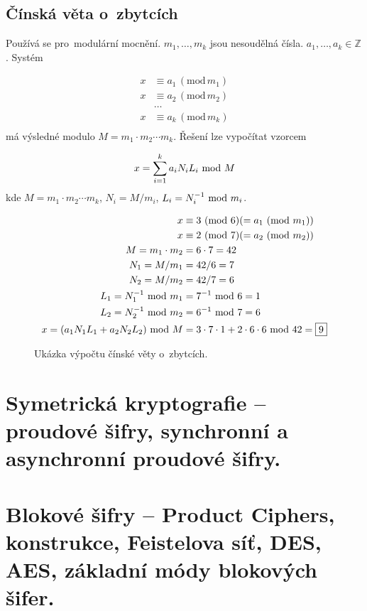 \clearpage
\subsection{Čínská věta o~zbytcích}

Používá se pro~modulární mocnění. $m_1, \dots, m_k$ jsou nesoudělná čísla. $a_1, \dots, a_k \in \mathbb{Z}$. Systém

\begin{align*}
x &\equiv a_1 \,(\mathrm{mod}\, m_1) \\
x &\equiv a_2 \,(\mathrm{mod}\, m_2) \\
&\dots \\
x &\equiv a_k \,(\mathrm{mod}\, m_k) \\
\end{align*} %
má výsledné modulo $M = m_1 \cdot m_2 \cdots m_k$. Řešení lze vypočítat vzorcem

$$ x = \sum_{i=1}^{k} a_i N_i L_i \ \mathrm{mod}\ M $$
kde $M = m_1 \cdot m_2 \cdots m_k$, $N_i = M / m_i$, $L_i = N_i^{-1} \ \mathrm{mod}\ m_i$.

\begin{figure}[ht]
\centering
\begin{align*}
x &\equiv 3 \ (\mathrm{mod}\ 6) (= a_1 \ (\mathrm{mod}\ m_1)) \\
x &\equiv 2 \ (\mathrm{mod}\ 7) (= a_2 \ (\mathrm{mod}\ m_2)) \\
M = m_1 \cdot m_2 &= 6 \cdot 7 = 42 \\
N_1 = M / m_1 &= 42 / 6 = 7 \\
N_2 = M / m_2 &= 42 / 7 = 6 \\
L_1 = N_1^{-1} \ \mathrm{mod}\ m_1 &= 7^{-1} \ \mathrm{mod}\ 6 = 1 \\
L_2 = N_2^{-1} \ \mathrm{mod}\ m_2 &= 6^{-1} \ \mathrm{mod}\ 7 = 6 \\
x = (a_1 N_1 L_1 + a_2 N_2 L_2) \ \mathrm{mod}\ M &= 3 \cdot 7 \cdot 1 + 2 \cdot 6 \cdot 6 \ \mathrm{mod}\ 42 = \boxed{9} \\
\end{align*}
\vspace*{-4em}
\caption*{Ukázka výpočtu čínské věty o~zbytcích.}
\end{figure}

\clearpage
\section{Symetrická kryptografie -- proudové šifry, synchronní a asynchronní proudové šifry.}
\label{question-4}

\clearpage
\section{Blokové šifry -- Product Ciphers, konstrukce, Feistelova síť, DES, AES, základní módy blokových šifer.}

